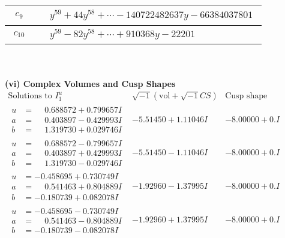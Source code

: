 \documentclass[1p]{elsarticle_modified}
\theoremstyle{definition}
\newcommand{\I}{\sqrt{-1}}
\begin{document}
\begin{tabular}{m{50pt}|m{274pt}}
\hline $$\begin{aligned}c_{9}\end{aligned}$$&$\begin{aligned}
&y^{59}+44 y^{58}+\cdots-140722482637 y-66384037801
\end{aligned}$\\
\hline $$\begin{aligned}c_{10}\end{aligned}$$&$\begin{aligned}
&y^{59}-82 y^{58}+\cdots+910368 y-22201
\end{aligned}$\\
\hline
\end{tabular}\\~\\
\newpage\flushleft \textbf{(vi) Complex Volumes and Cusp Shapes}
$$\begin{array}{c|c|c}  
\text{Solutions to }I^u_{1}& \I (\text{vol} + \sqrt{-1}CS) & \text{Cusp shape}\\
 \hline 
\begin{aligned}
u &= \phantom{-}0.688572 + 0.799657 I \\
a &= \phantom{-}0.403897 - 0.429993 I \\
b &= \phantom{-}1.319730 + 0.029746 I\end{aligned}
 & -5.51450 + 1.11046 I & -8.00000 + 0. I\phantom{ +0.000000I} \\ \hline\begin{aligned}
u &= \phantom{-}0.688572 - 0.799657 I \\
a &= \phantom{-}0.403897 + 0.429993 I \\
b &= \phantom{-}1.319730 - 0.029746 I\end{aligned}
 & -5.51450 - 1.11046 I & -8.00000 + 0. I\phantom{ +0.000000I} \\ \hline\begin{aligned}
u &= -0.458695 + 0.730749 I \\
a &= \phantom{-}0.541463 + 0.804889 I \\
b &= -0.180739 + 0.082078 I\end{aligned}
 & -1.92960 - 1.37995 I & -8.00000 + 0. I\phantom{ +0.000000I} \\ \hline\begin{aligned}
u &= -0.458695 - 0.730749 I \\
a &= \phantom{-}0.541463 - 0.804889 I \\
b &= -0.180739 - 0.082078 I\end{aligned}
 & -1.92960 + 1.37995 I & -8.00000 + 0. I\phantom{ +0.000000I} \\ \hline\begin{aligned}

\end{aligned}
\end{array}$$
\end{document}
